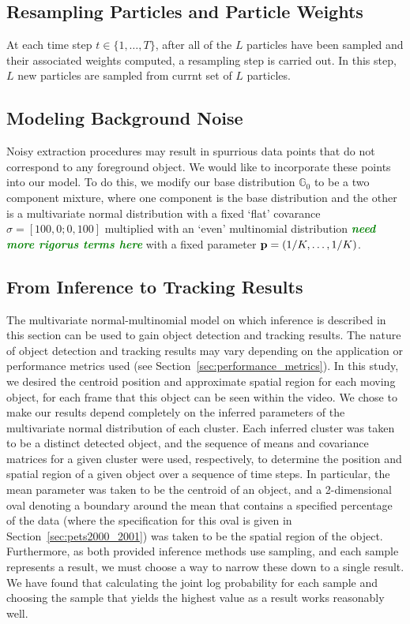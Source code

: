 \documentclass[smallcondensed, final]{svjour3}
\newcommand{\willie}[1]{\textcolor{green}{\textsf{\emph{\textbf{\textcolor{green}{#1}}}}}}
\begin{document}
\subsection{Resampling Particles and Particle Weights}

At each time step $t \in \{ 1, \ldots, T \}$, after all of the $L$ particles have been sampled and their associated weights computed, a resampling step is carried out. In this step, $L$ new particles are sampled from currnt set of $L$ particles.





\subsection{Modeling Background Noise}

Noisy extraction procedures may result in spurrious data points that do not correspond to any foreground object. We would like to incorporate these points into our model. To do this, we modify our base distribution $\mathbb{G}_{0}$ to be a two component mixture, where one component is the base distribution and the other is a multivariate normal distribution with a fixed `flat' covarance $\sigma = [100, 0; 0, 100]$ multiplied with an `even' multinomial distribution \willie{need more rigorus terms here} with a fixed parameter $\bold{p} = (1/K, \ldots, 1/K)$.


\subsection{From Inference to Tracking Results}
\label{sec:inference_to_results}
The multivariate normal-multinomial model on which inference is described in this section can be used to gain object detection and tracking results. The nature of object detection and tracking results may vary depending on the application or performance metrics used (see Section~\ref{sec:performance_metrics}). In this study, we desired the centroid position and approximate spatial region for each moving object, for each frame that this object can be seen within the video. We chose to make our results depend completely on the inferred parameters of the multivariate normal distribution of each cluster. Each inferred cluster was taken to be a distinct detected object, and the sequence of means and covariance matrices for a given cluster were used, respectively, to determine the position and spatial region of a given object over a sequence of time steps. In particular, the mean parameter was taken to be the centroid of an object, and a 2-dimensional oval denoting a boundary around the mean that contains a specified percentage of the data (where the specification for this oval is given in Section~\ref{sec:pets2000_2001}) was taken to be the spatial region of the object. Furthermore, as both provided inference methods use sampling, and each sample represents a result, we must choose a way to narrow these down to a single result. We have found that calculating the joint log probability for each sample and choosing the sample that yields the highest value as a result works reasonably well.
\end{document}
